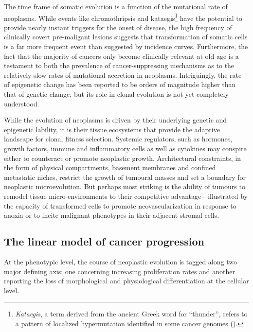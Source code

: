 The time frame of somatic evolution is a function of the mutational rate of
neoplasms.  While events like chromothripsis and
kataegis\footnote{\emph{Kataegis}, a term derived from the ancient Greek word
  for ``thunder'', refers to a pattern of localized hypermutation identified in
  some cancer genomes (\mbox{\citealp{nik-zainal_mutational_2012}}).} have the
potential to provide nearly instant triggers for the onset of disease, the high
frequency of clinically covert \mbox{pre-maligant}
lesions\cite{sakr_frequency_1993} suggests that transformation of somatic cells
is a far more frequent event than suggested by incidence curves.  Furthermore, the
fact that the majority of cancers only become clinically relevant at old age is
a testament to both the prevalence of cancer-suppressing mechanisms as to the
relatively slow rates of mutational accretion in neoplasms.  Intriguingly, the
rate of epigenetic change has been reported to be orders of magnitude higher
than that of genetic change,\cite{siegmund_inferring_2009} but its role in
clonal evolution is not yet completely understood.


While the evolution of neoplasms is driven by their underlying genetic and
epigenetic lability, it is their tissue ecosystems that provide the adaptive
landscape for clonal fitness selection.\cite{greaves_clonal_2012} Systemic
regulators, such as hormones, growth factors, immune and inflammatory cells as
well as cytokines may conspire either to counteract or promote neoplastic
growth.\cite{bierie_tumour_2006,hanahan_hallmarks_2011} Architectural
constraints, in the form of physical compartments, basement membranes and
confined metastatic niches, restrict the growth of tumoural masses and set a
boundary for neoplastic microevolution.  But perhaps most striking is the
ability of tumours to remodel tissue micro-environments to their competitive
advantage---illustrated by the capacity of transformed cells to promote
neovascularization in response to anoxia or to incite malignant phenotypes in
their adjacent stromal cells.\cite{lathia_deadly_2011}

\subsection{The linear model of cancer progression}
\label{sec:models-cancer-progression}

At the phenotypic level, the course of neoplastic evolution is tagged along two
major defining axis: one concerning increasing proliferation rates and another
reporting the loss of morphological and physiological differentiation at the
cellular level.\cite{tarabichi_systems_2013}

